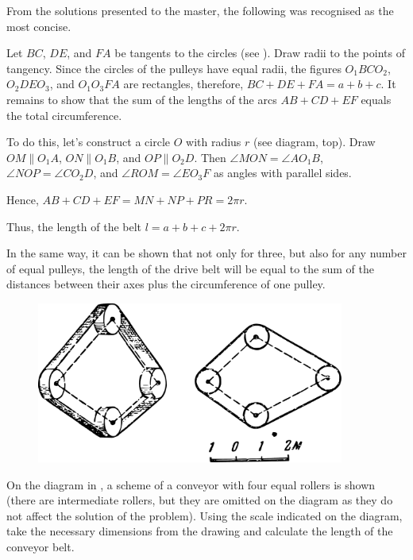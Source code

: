 From the solutions presented to the master, the following was recognised as the most concise.

Let $BC$, $DE$, and $FA$ be tangents to the circles (see ). Draw radii to the points of tangency. Since the circles of the pulleys have equal radii, the figures $O_{1}BCO_{2}$, $ O_{2}DEO_{3} $, and $ O_{1}O_{3}FA $ are rectangles, therefore, $ BC + DE + FA = a + b + c $. It remains to show that the sum of the lengths of the arcs $AB + CD + EF$ equals the total circumference.


To do this, let's construct a circle $O$ with radius $ r $ (see diagram, top). Draw $OM \parallel O_{1}A$, $ON \parallel O_{1}B$, and $OP \parallel O_{2}D$. Then $ \angle MON = \angle AO_{1}B $, $ \angle NOP = \angle CO_{2}D $, and $ \angle ROM = \angle EO_{3}F $ as angles with parallel sides.

Hence, $ AB + CD + EF = MN + NP + PR = 2\pi r $.

Thus, the length of the belt $ l = a + b + c + 2\pi r $.

In the same way, it can be shown that not only for three, but also for any number of equal pulleys, the length of the drive belt will be equal to the sum of the distances between their axes plus the circumference of one pulley.

\begin{figure}[h!]
\centering
\includegraphics[width=0.9\textwidth]{figures/ch-09/fig-140.pdf}
\end{figure}


\ans On the diagram in , a scheme of a conveyor with four equal rollers is shown (there are intermediate rollers, but they are omitted on the diagram as they do not affect the solution of the problem). Using the scale indicated on the diagram, take the necessary dimensions from the drawing and calculate the length of the conveyor belt.


